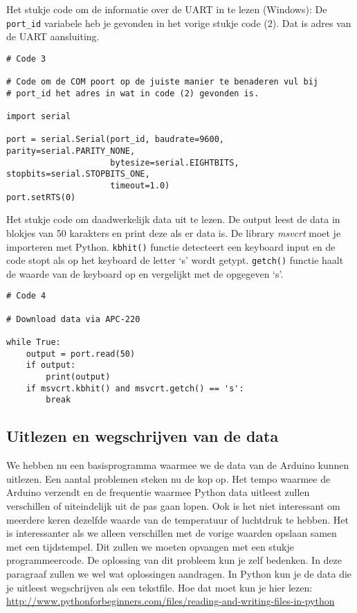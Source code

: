 Het stukje code om de informatie over de UART in te lezen (Windows):
De \verb|port_id| variabele heb je gevonden in het vorige stukje code (2).
Dat is adres van de UART aansluiting.

\begin{verbatim}
# Code 3

# Code om de COM poort op de juiste manier te benaderen vul bij 
# port_id het adres in wat in code (2) gevonden is.

import serial 

port = serial.Serial(port_id, baudrate=9600, parity=serial.PARITY_NONE, 
                     bytesize=serial.EIGHTBITS, stopbits=serial.STOPBITS_ONE,
                     timeout=1.0) 
port.setRTS(0)
\end{verbatim}

Het stukje code om daadwerkelijk data uit te lezen. De output leest de
data in blokjes van 50 karakters en print deze als er data is. De
library \emph{msvcrt} moet je importeren met Python. \verb|kbhit()|
functie detecteert een keyboard input en de code stopt als op het keyboard de
letter `s' wordt getypt. \verb|getch()| functie haalt de waarde van de keyboard 
 op en vergelijkt met de opgegeven `s'.

\begin{verbatim}
# Code 4

# Download data via APC-220  
 
while True:
    output = port.read(50)
    if output:
        print(output)
    if msvcrt.kbhit() and msvcrt.getch() == 's':
        break
\end{verbatim}


\subsection{Uitlezen en wegschrijven van de data}

We hebben nu een basisprogramma waarmee we de data van de Arduino kunnen
uitlezen. Een aantal problemen steken nu de kop op. Het tempo waarmee de
Arduino verzendt en de frequentie waarmee Python data uitleest zullen
verschillen of uiteindelijk uit de pas gaan lopen. Ook is het niet
interessant om meerdere keren dezelfde waarde van de temperatuur of
luchtdruk te hebben. Het is interessanter als we alleen verschillen met
de vorige waarden opslaan samen met een tijdstempel. Dit zullen we moeten opvangen met een stukje
programmeercode. De oplossing van dit probleem kun je zelf bedenken.
In deze paragraaf zullen we wel wat oplossingen aandragen.
In Python kun je de data die je uitleest wegschrijven als een tekstfile.
Hoe dat moet kun je hier lezen:
\url{http://www.pythonforbeginners.com/files/reading-and-writing-files-in-python}

